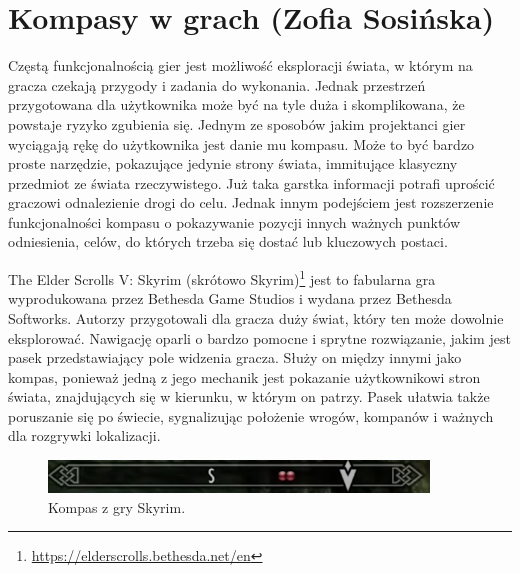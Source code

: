 \section{Kompasy w grach (Zofia Sosińska)}\label{chap:skrm}
Częstą funkcjonalnością gier jest możliwość eksploracji świata, w którym na gracza czekają przygody i zadania do wykonania.
Jednak przestrzeń przygotowana dla użytkownika może być na tyle duża i skomplikowana, że powstaje ryzyko 
zgubienia się. Jednym ze sposobów jakim projektanci gier wyciągają rękę do użytkownika jest danie mu
kompasu. Może to być bardzo proste narzędzie, pokazujące jedynie strony świata, immitujące klasyczny przedmiot ze świata rzeczywistego.
Już taka garstka informacji potrafi uprościć graczowi odnalezienie drogi do celu. Jednak innym podejściem jest rozszerzenie
funkcjonalności kompasu o pokazywanie pozycji innych ważnych punktów odniesienia, celów, do których trzeba się dostać lub 
kluczowych postaci.

The Elder Scrolls V: Skyrim (skrótowo Skyrim)\footnote{\url{https://elderscrolls.bethesda.net/en}} jest to fabularna gra
wyprodukowana przez Bethesda Game Studios i wydana przez Bethesda Softworks. Autorzy przygotowali dla gracza duży świat,
który ten może dowolnie eksplorować. Nawigację oparli o bardzo pomocne i sprytne rozwiązanie,
jakim jest pasek przedstawiający pole widzenia gracza. Służy on między innymi jako kompas, ponieważ 
jedną z jego mechanik jest pokazanie użytkownikowi stron świata, znajdujących się w kierunku, w którym 
on patrzy. Pasek ułatwia także poruszanie się po świecie, sygnalizując położenie wrogów, kompanów i ważnych 
dla rozgrywki lokalizacji.

\begin{figure}[htbp]
	\centering
	\includegraphics[width=0.9\textwidth]{images/ui/compassSkyrim.png}
	\caption{Kompas z gry Skyrim.}\label{fig:Fallout}
\end{figure}

